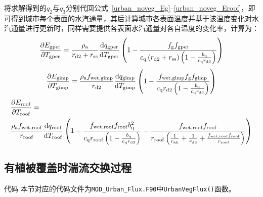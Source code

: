 将求解得到的$q_{2}$与$q_{3}$分别代回公式~\eqref{urban_noveg_Eg}--\eqref{urban_noveg_Eroof}，即可得到城市每个表面的水汽通量，其后计算城市各表面温度并基于该温度变化对水汽通量进行更新时，同样需要提供各表面水汽通量对各自温度的变化率，计算为：
\begin{equation}
  \frac{\partial  E_{\mathrm{gper}}}{\partial T_{\mathrm{gper}}} = \frac{\rho _{\rm a}}{r_{\mathrm{d2}}+r_{\mathrm{ss}}} \frac{{\mathrm {d}} q_{\mathrm{gper}}}{{\mathrm {d}} T_{\mathrm{gper}}} \left(1-\frac{f_{\mathrm{g}}f_{\mathrm{gper}}}{c_{\mathrm{q}} \left(r_{\mathrm{d2}}+r_{\mathrm{ss}}\right) \left(1-\frac{b_{\mathrm{q}}}{c_{\mathrm{q}} r_{\mathrm{d3}}}\right)}\right)
\end{equation}
%
\begin{equation}
  \frac{\partial  E_{\mathrm{gimp}}}{\partial T_{\mathrm{gimp}}} = \frac{\rho _{\rm a} f_{\mathrm{wet,gimp}}}{r_{\mathrm{d2}}} \frac{{\mathrm {d}} q_{\mathrm{gimp}}}{{\mathrm {d}} T_{\mathrm{gimp}}} \left(1-\frac{f_{\mathrm{wet,gimp}} f_{\mathrm{g}} f_{\mathrm{gimp}}}{c_{\mathrm{q}} r_{\mathrm{d2}}\left(1-\frac{b_{\mathrm{q}}}{c_{\mathrm{q}} r_{\mathrm{d3}}}\right)}\right)
\end{equation}
%
\begin{equation}
  \begin{split}
    &\frac{\partial  E_{\mathrm{roof}}}{\partial T_{\mathrm{roof}}} = \\
    &\frac{\rho _{\rm a} f_{\mathrm{wet,roof}}}{r_{\mathrm{roof}}} \frac{{\mathrm {d}} q_{\mathrm{roof}}}{{\mathrm {d}} T_{\mathrm{roof}}}\left(1-\frac{f_{\mathrm{wet,roof}}f_{\mathrm{roof}} b_{\mathrm{q}}^2}{c_{\mathrm{q}} r_{\mathrm{roof}} \left(1-\frac{b_{\mathrm{q}}}{c_{\mathrm{q}} r_{\mathrm{d3}}}\right)}-\frac{f_{\mathrm{wet,roof}}f_{\mathrm{roof}}}{r_{\mathrm{roof}}\left(\frac{1}{r_{\mathrm{ah}}}+\frac{1}{r_{\mathrm{d3}}}+\frac{f_{\mathrm{wet,roof}} f_{\mathrm{roof}}}{r_{\mathrm{roof}}}\right)}\right)
  \end{split}
\end{equation}

\subsection{有植被覆盖时湍流交换过程}
\begin{mymdframed}{代码}
  本节对应的代码文件为\texttt{MOD\_Urban\_Flux.F90}中\texttt{UrbanVegFlux()}函数。
\end{mymdframed}

